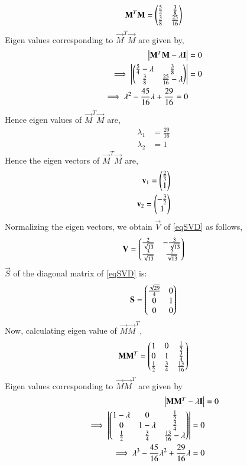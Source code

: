 \documentclass[journal,12pt,twocolumn]{IEEEtran}
\begin{document}
\begin{align}
\mathbf{M}^T\mathbf{M}=\begin{pmatrix}\frac{5}{4}&\frac{3}{8}\\\frac{3}{8}&\frac{25}{16}\end{pmatrix}\label{eqMTM}
\end{align}
Eigen values corresponding to $\Vec{M}^T\Vec{M}$ are given by,
\begin{align}
\begin{vmatrix}\mathbf{M}^T\mathbf{M}-\lambda\mathbf{I}\end{vmatrix} &= 0\\
\implies\begin{vmatrix}\begin{pmatrix}\frac{5}{4}-\lambda&\frac{3}{8}\\\frac{3}{8}&\frac{25}{16}-\lambda\end{pmatrix}\end{vmatrix} &=0\\
\implies \lambda^2-\frac{45}{16}\lambda+\frac{29}{16}=0
\end{align}
Hence eigen values of $\vec{M}^T\vec{M}$ are,
\begin{align}
\lambda_1 &= \frac{29}{16}\\
\lambda_2 &= 1
\end{align}
Hence the eigen vectors of $\vec{M}^T\vec{M}$ are,
\begin{align}
\mathbf{v}_1=\begin{pmatrix}\frac{2}{3}\\1\end{pmatrix}\\
\mathbf{v}_2=\begin{pmatrix}-\frac{3}{2}\\1\end{pmatrix}
\end{align}
Normalizing the eigen vectors, we obtain $\vec{V}$ of \eqref{eqSVD} as follows,
\begin{align}
\mathbf{V}=\begin{pmatrix}\frac{2}{\sqrt{13}}&-\frac{3}{\sqrt{13}}\\ \frac{3}{\sqrt{13}}&\frac{2}{\sqrt{13}}\end{pmatrix}\label{eqV}
\end{align}
$\vec{S}$ of the diagonal matrix of \eqref{eqSVD} is:
\begin{align}
\mathbf{S}=\begin{pmatrix}\frac{\sqrt{29}}{4}&0\\0&1\\0&0\end{pmatrix}\label{eqS}
\end{align}
Now, calculating eigen value of $\vec{M}\vec{M}^T$,
\begin{align}
    \Vec{M}\Vec{M}^T=\myvec{1&0&\frac{1}{2}\\0&1&\frac{3}{4}\\\frac{1}{2}&\frac{3}{4}&\frac{13}{16}}
\end{align}
Eigen values corresponding to $\vec{M}\Vec{M}^T$ are given by
\begin{align}
\begin{vmatrix}\mathbf{M}\mathbf{M}^T-\lambda\mathbf{I}\end{vmatrix} &= 0\\
\implies \begin{vmatrix}\begin{pmatrix}1-\lambda&0&\frac{1}{2}\\0&1-\lambda&\frac{3}{4}\\\frac{1}{2}&\frac{3}{4}&\frac{13}{16}-\lambda\end{pmatrix}\end{vmatrix}=0\\
\implies \lambda^3-\frac{45}{16}\lambda^2+\frac{29}{16}\lambda=0
\end{align}
\end{document}
